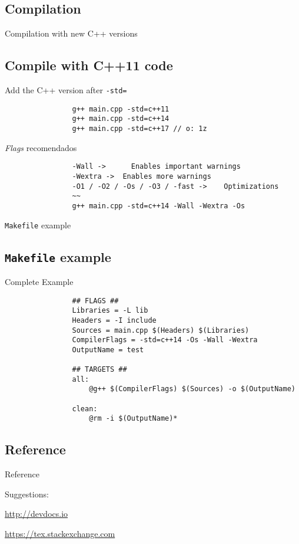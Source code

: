 \documentclass{beamer}
\newcommand{\normalSizeItem}[1] {
  \normalsize{\item #1}
}
\newcommand{\newFrameWithoutIndex}[1]{
	\begin{frame}
		#1
		\thispagestyle{empty}
	\end{frame}
}
\newcommand{\newSectionWithoutIndex}[1]{
	\newFrameWithoutIndex{\section{#1}}
}
\newcommand{\urlItem}[1]{
	\footnotesize{\item {\url {#1}}}
}
\begin{document}
	\newSectionWithoutIndex{Compilation}	
  
		\begin{frame}[fragile]{Compilation with new C++ versions}	
			\subsection{Compile with C++11 code}
			\begin{itemize}
			
				\normalSizeItem {Add the C++ version after \texttt{-std=}}
				\begin{lstlisting}
				g++ main.cpp -std=c++11
				g++ main.cpp -std=c++14
				g++ main.cpp -std=c++17 // o: 1z
				\end{lstlisting}
				
				\normalSizeItem {\textit{Flags} recomendados}
				\begin{lstlisting}
				-Wall ->	  Enables important warnings
				-Wextra ->	Enables more warnings
				-O1 / -O2 / -Os / -O3 / -fast ->	Optimizations
				~~
				g++ main.cpp -std=c++14 -Wall -Wextra -Os
				\end{lstlisting}
				
			\end{itemize}
		\end{frame}
		
		\begin{frame}[fragile]{\texttt{Makefile} example}	
			\subsection{\texttt{Makefile} example}
			\begin{itemize}
			
				\normalSizeItem {Complete Example}
				\begin{lstlisting}
				## FLAGS ##
				Libraries = -L lib
				Headers = -I include
				Sources = main.cpp $(Headers) $(Libraries)
				CompilerFlags = -std=c++14 -Os -Wall -Wextra
				OutputName = test
				
				## TARGETS ##
				all: 
					@g++ $(CompilerFlags) $(Sources) -o $(OutputName)
				
				clean:
					@rm -i $(OutputName)*
				\end{lstlisting}
				
			\end{itemize}
		\end{frame}
		
	\newSectionWithoutIndex{Reference}	
		\tiny
		\begin{frame}[allowframebreaks]{Reference}
			
			
			\small
			Suggestions:
			\begin{itemize}
				\urlItem{http://devdocs.io}
				\urlItem{https://tex.stackexchange.com}
			\end{itemize}
		\end{frame}
\end{document}

